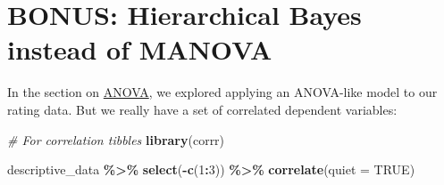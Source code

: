 \documentclass[
]{book}
\newenvironment{Shaded}{\begin{snugshade}}{\end{snugshade}}
\newcommand{\AttributeTok}[1]{\textcolor[rgb]{0.13,0.29,0.53}{#1}}
\newcommand{\CommentTok}[1]{\textcolor[rgb]{0.56,0.35,0.01}{\textit{#1}}}
\newcommand{\ConstantTok}[1]{\textcolor[rgb]{0.56,0.35,0.01}{#1}}
\newcommand{\DecValTok}[1]{\textcolor[rgb]{0.00,0.00,0.81}{#1}}
\newcommand{\FunctionTok}[1]{\textcolor[rgb]{0.13,0.29,0.53}{\textbf{#1}}}
\newcommand{\NormalTok}[1]{#1}
\newcommand{\SpecialCharTok}[1]{\textcolor[rgb]{0.81,0.36,0.00}{\textbf{#1}}}
\begin{document}
\section{BONUS: Hierarchical Bayes instead of MANOVA}\label{bonus-hierarchical-bayes-instead-of-manova}

In the section on \hyperref[analysis-of-variance]{ANOVA}, we explored applying an ANOVA-like model to our rating data. But we really have a set of correlated dependent variables:

\begin{Shaded}
\begin{Highlighting}[]
\CommentTok{\# For correlation tibbles}
\FunctionTok{library}\NormalTok{(corrr)}

\NormalTok{descriptive\_data }\SpecialCharTok{\%\textgreater{}\%}
  \FunctionTok{select}\NormalTok{(}\SpecialCharTok{{-}}\FunctionTok{c}\NormalTok{(}\DecValTok{1}\SpecialCharTok{:}\DecValTok{3}\NormalTok{)) }\SpecialCharTok{\%\textgreater{}\%}
  \FunctionTok{correlate}\NormalTok{(}\AttributeTok{quiet =} \ConstantTok{TRUE}\NormalTok{)}
\end{Highlighting}
\end{Shaded}
\end{document}
